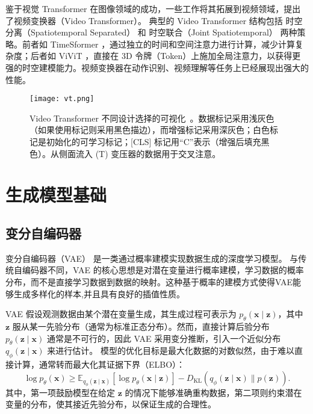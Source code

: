 鉴于视觉 Transformer 在图像领域的成功，一些工作将其拓展到视频领域，提出了视频变换器（Video Transformer）。
典型的 Video Transformer 结构包括 时空分离（Spatiotemporal Separated） 和 时空联合（Joint Spatiotemporal） 两种策略。前者如 TimeSformer \cite{bertasius2021space}，通过独立的时间和空间注意力进行计算，减少计算复杂度；后者如 ViViT \cite{arnab2021vivit}，直接在 3D 令牌（Token）上施加全局注意力，以获得更强的时空建模能力。视频变换器在动作识别、视频理解等任务上已经展现出强大的性能。

\begin{figure}[htbp]
    \centering
    \texttt{[image: vt.png]}
    \caption{Video Transformer 不同设计选择的可视化~\cite{selva2023video}。数据标记采用浅灰色（如果使用标记则采用黑色描边），而增强标记采用深灰色；白色标记是初始化的可学习标记；[CLS] 标记用“C”表示（增强后填充黑色）。从侧面流入 (T) 变压器的数据用于交叉注意。}
    \label{fig:vt}
\end{figure}

\section{生成模型基础}

\subsection{变分自编码器}

变分自编码器（VAE）\cite{kingma2013vae} 是一类通过概率建模实现数据生成的深度学习模型。
与传统自编码器不同，VAE 的核心思想是对潜在变量进行概率建模，学习数据的概率分布，而不是直接学习数据到数据的映射。这种基于概率的建模方式使得VAE能够生成多样化的样本,并且具有良好的插值性质。

VAE 假设观测数据由某个潜在变量生成，其生成过程可表示为 $p_{\theta}(\mathbf{x} \mid \mathbf{z})$，其中 $\mathbf{z}$ 服从某一先验分布（通常为标准正态分布）。然而，直接计算后验分布 $p_{\theta}(\mathbf{z} \mid \mathbf{x})$ 通常是不可行的，因此 VAE 采用变分推断，引入一个近似分布 $q_{\phi}(\mathbf{z} \mid \mathbf{x})$ 来进行估计。
模型的优化目标是最大化数据的对数似然，由于难以直接计算，通常转而最大化其证据下界（ELBO）：
\begin{equation}
    \log p_{\theta}(\mathbf{x}) \geq \mathbb{E}_{q_{\phi}(\mathbf{z} \mid \mathbf{x})} \left[ \log p_{\theta}(\mathbf{x} \mid \mathbf{z}) \right] - D_{\mathrm{KL}} \left( q_{\phi}(\mathbf{z} \mid \mathbf{x}) \parallel p(\mathbf{z}) \right).
\end{equation}
其中，第一项鼓励模型在给定 $\mathbf{z}$ 的情况下能够准确重构数据，第二项则约束潜在变量的分布，使其接近先验分布，以保证生成的合理性。

